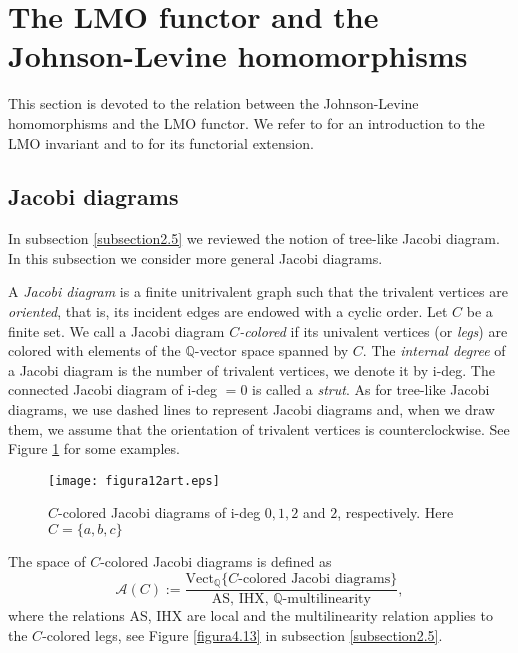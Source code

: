 \documentclass[10pt]{amsart}
\numberwithin{equation}{section}
\numberwithin{equation}{section}
\theoremstyle{definition}
\begin{document}
\section{The LMO functor and the Johnson-Levine homomorphisms}\label{seccion5}
 This section is devoted to the relation between the Johnson-Levine homomorphisms and the LMO functor. We refer to \cite{MR1881401,MR1931167,MR1931168} for an introduction to the LMO invariant and to \cite{MR2403806} for its functorial extension.

\subsection{Jacobi diagrams}\label{section5.1} In subsection \ref{subsection2.5} we reviewed the notion of tree-like Jacobi diagram. In this subsection we consider more general Jacobi diagrams.

A  \emph{Jacobi diagram} is a finite unitrivalent graph such that the trivalent vertices are \emph{oriented}, that is, its incident edges  are endowed with a cyclic order. Let $C$ be a finite set. We call a Jacobi diagram  $C$\emph{-colored} if its univalent vertices (or \emph{legs})  are colored with elements of the $\mathbb{Q}$-vector space spanned by $C$. The \emph{internal degree} of a Jacobi diagram is the number of trivalent vertices, we denote it by i-deg. The connected Jacobi diagram of i-deg $=0$ is called a \emph{strut}. As for tree-like Jacobi diagrams, we use dashed lines to represent Jacobi diagrams and, when we draw them, we assume that the orientation of trivalent vertices is counterclockwise. See Figure \ref{figura4.12} for some examples. 
\begin{figure}[ht!] 
										\centering
                        \texttt{[image: figura12art.eps]}
												\caption{$C$-colored Jacobi diagrams of i-deg  $0, 1, 2$ and $2$, respectively. Here $C=\{a,b,c\}$ }
												\label{figura4.12}
\end{figure}

The space of $C$-colored Jacobi diagrams is defined as
$$\mathcal{A}(C):=\frac{\text{Vect}_{\mathbb{Q}}\{C\text{-colored Jacobi diagrams}\}}{\text{AS, IHX, $\mathbb{Q}$-multilinearity}},$$
\noindent where the relations AS, IHX  are local and the multilinearity relation applies to the $C$-colored legs, see Figure \ref{figura4.13} in subsection \ref{subsection2.5}.
\end{document}
